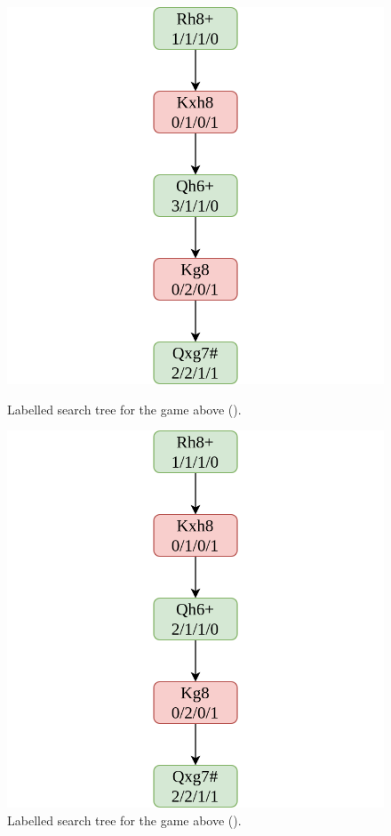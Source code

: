 \begin{figure}[H]
  \begin{minipage}{0.475\textwidth}
    \centering
    \includegraphics[width=\textwidth]{project/img/trees/3.drawio.png}
    \caption{Labelled search tree for the game above ().}
    \label{tree3}
  \end{minipage}
  \hspace{0.05\textwidth}
  \begin{minipage}{0.475\textwidth}
    \centering
    \includegraphics[width=\textwidth]{project/img/trees/4.drawio.png}
    \caption{Labelled search tree for the game above ().}
    \label{tree4}
  \end{minipage}
\end{figure}

